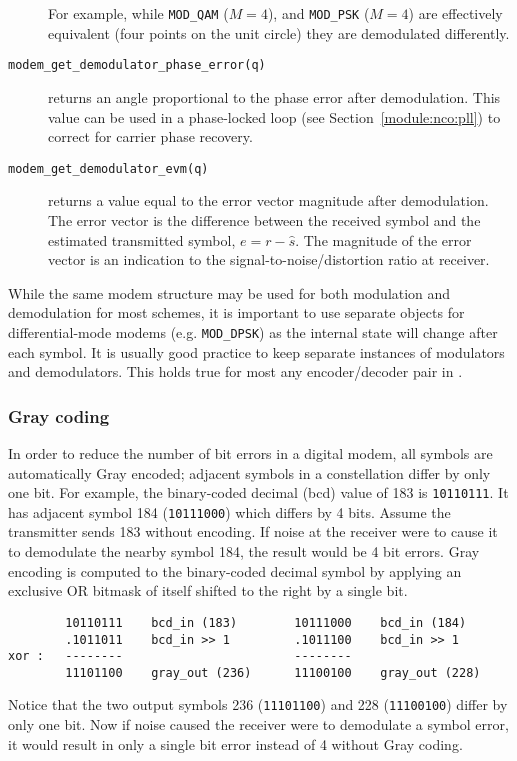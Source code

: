 \begin{description}
    For example, while
    {\tt MOD\_QAM} ($M=4$), and
    {\tt MOD\_PSK} ($M=4$)
    are effectively equivalent (four points on the unit circle)
    they are demodulated differently.
\item[{\tt modem\_get\_demodulator\_phase\_error(q)}]
    returns an angle proportional to the phase error after demodulation.
    This value can be used in a phase-locked loop
    (see Section~\ref{module:nco:pll})
    to correct for carrier phase recovery.
\item[{\tt modem\_get\_demodulator\_evm(q)}]
    returns a value equal to the error vector magnitude after demodulation.
    The error vector is the difference between the received symbol and the
    estimated transmitted symbol, $e = r - \hat{s}$.
    The magnitude of the error vector is an indication to the
    signal-to-noise/distortion ratio at receiver.
\end{description}

While the same modem structure may be used for both modulation and
demodulation for most schemes, it is important to use separate objects
for differential-mode modems (e.g. {\tt MOD\_DPSK}) as the internal state
will change after each symbol.
It is usually good practice to keep separate instances of modulators and
demodulators.
This holds true for most any encoder/decoder pair in \liquid.

\subsubsection{Gray coding}
\label{module:modem:digital:gray_coding}
In order to reduce the number of bit errors in a digital modem,
all symbols are automatically Gray encoded;
adjacent symbols in a constellation differ by only one bit.
%
For example, the binary-coded decimal (bcd) value of 183 is {\tt 10110111}.
It has adjacent symbol 184 ({\tt 10111000}) which differs by 4 bits.
Assume the transmitter sends 183 without encoding.
If noise at the receiver were to cause it to demodulate the nearby symbol 184,
the result would be 4 bit errors.
%
Gray encoding is computed to the binary-coded decimal symbol
by applying an exclusive OR bitmask of itself shifted to the right by a
single bit.
\begin{verbatim}
        10110111    bcd_in (183)        10111000    bcd_in (184)
        .1011011    bcd_in >> 1         .1011100    bcd_in >> 1
xor :   --------                        --------
        11101100    gray_out (236)      11100100    gray_out (228)
\end{verbatim}
Notice that the two output symbols
236 ({\tt 11101100}) and
228 ({\tt 11100100}) differ by only one bit.
Now if noise caused the receiver were to demodulate a symbol error, it would
result in only a single bit error instead of 4 without Gray coding.

